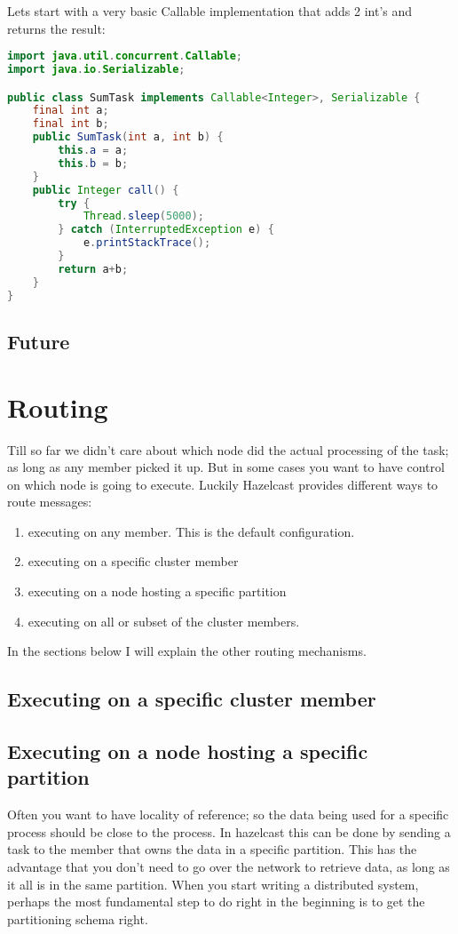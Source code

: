 Lets start with a very basic Callable implementation that adds 2 int's and returns the result:
\begin{lstlisting}[language=java]
import java.util.concurrent.Callable;
import java.io.Serializable;

public class SumTask implements Callable<Integer>, Serializable {
    final int a;
    final int b;
    public SumTask(int a, int b) {
        this.a = a;
        this.b = b;
    }
    public Integer call() {
        try {
            Thread.sleep(5000); 
        } catch (InterruptedException e) {
            e.printStackTrace();
        }	    
        return a+b;
    }
}

\end{lstlisting}

\subsection{Future}

\section{Routing}

Till so far we didn't care about which node did the actual processing of the task; as long as any member picked it up. But in some cases you want to have control on which node is going to execute. Luckily Hazelcast provides different ways to route messages:
\begin{enumerate}
\item executing on any member. This is the default configuration.
\item executing on a specific cluster member
\item executing on a node hosting a specific partition
\item executing on all or subset of the cluster members.
\end{enumerate}
In the sections below I will explain the other routing mechanisms.

\subsection{Executing on a specific cluster member}

\subsection{Executing on a node hosting a specific partition}
Often you want to have locality of reference; so the data being used for a specific process should be close to the process. In hazelcast this can be done by sending a task to the member that owns the data in a specific partition. This has the advantage that you don't need to go over the network to retrieve data, as long as it all is in the same partition. When you start writing a distributed system, perhaps the most fundamental step to do right in the beginning is to get the partitioning schema right.

